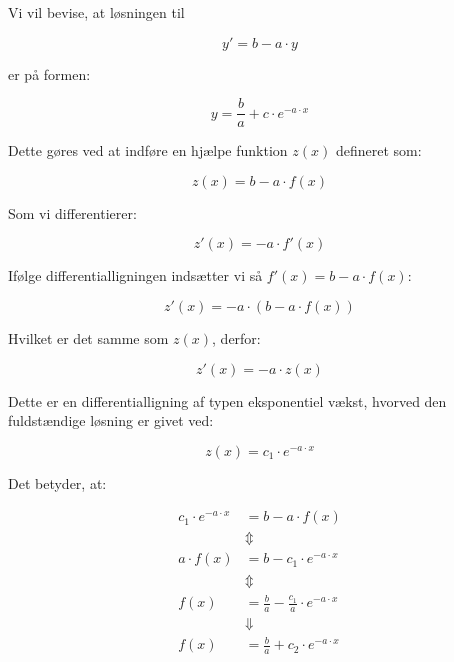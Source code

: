 \begin{proofw}
    
Vi vil bevise, at løsningen til 

$$y'=b-a\cdot y$$

er på formen:

$$
    y=\frac{b}{a}+c\cdot e^{-a \cdot x}
$$

Dette gøres ved at indføre en hjælpe funktion $z(x)$ defineret som:

$$
    z(x)=b-a\cdot f(x)
$$

Som vi differentierer:

$$
    z'(x)=-a\cdot f'(x)
$$

Ifølge differentialligningen indsætter vi så $f'(x)=b-a\cdot f(x)$:

$$
    z'(x)=-a\cdot (b-a \cdot f(x))
$$

Hvilket er det samme som $z(x)$, derfor:

$$
    z'(x)=-a\cdot z(x)
$$

Dette er en differentialligning af typen eksponentiel vækst,
hvorved den fuldstændige løsning er givet ved:

$$
    z(x)=c_1\cdot e^{-a\cdot x}
$$

Det betyder, at:

\begin{align*}
    c_1\cdot e^{-a\cdot x}&=b-a\cdot f(x)
    \\
    &\Updownarrow
    \\
    a\cdot f(x)&=b-c_1\cdot e^{-a\cdot x}
     \\
    &\Updownarrow
    \\
    f(x)&=\frac{b}{a}-\frac{c_1}{a}\cdot e^{-a\cdot x}
    \\
    &\Downarrow
    \\
    f(x)&=\frac{b}{a}+c_2\cdot e^{-a\cdot x}
\end{align*}

\end{proofw}
